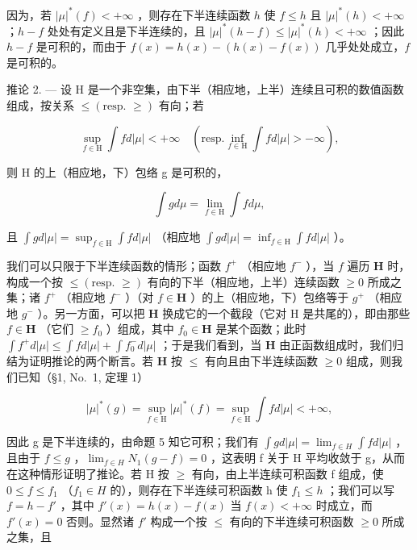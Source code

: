 因为，若 \(|\mu|^*(f) < +\infty\) ，则存在下半连续函数 \(h\) 使 \(f \leqslant h\) 且 \(|\mu|^*(h) < +\infty\) ；\(h - f\) 处处有定义且是下半连续的，且 \(|\mu|^*(h - f) \leqslant |\mu|^*(h) < +\infty\) ；因此 \(h - f\) 是可积的，而由于 \(f(x) = h(x) - (h(x) - f(x))\) 几乎处处成立，\(f\) 是可积的。

推论 2. --- 设 H 是一个非空集，由下半（相应地，上半）连续且可积的数值函数组成，按关系 \(\leqslant (\text{resp. } \geqslant)\) 有向；若

\[
\sup _ {f \in \mathrm{H}} \int f d | \mu | <   + \infty \quad (\mathrm{resp.} \inf _ {f \in \mathrm{H}} \int f d | \mu | > - \infty),
\]

则 H 的上（相应地，下）包络 g 是可积的，

\[
\int g d \mu = \lim _ {f \in \mathrm{H}} \int f d \mu ,
\]

且 \(\int g d|\mu| = \sup_{f\in \mathrm{H}}\int f d|\mu|\) （相应地 \(\int g d|\mu| = \inf_{f\in \mathrm{H}}\int f d|\mu|\) ）。

我们可以只限于下半连续函数的情形；函数 \(f^{+}\) （相应地 \(f^{-}\) ），当 \(f\) 遍历 \(\mathbf{H}\) 时，构成一个按 \(\leqslant (\text{resp. } \geqslant)\) 有向的下半（相应地，上半）连续函数 \(\geqslant 0\) 所成之集；诸 \(f^{+}\) （相应地 \(f^{-}\) ）（对 \(f \in \mathbf{H}\) ）的上（相应地，下）包络等于 \(g^{+}\) （相应地 \(g^{-}\) ）。另一方面，可以把 \(\mathbf{H}\) 换成它的一个截段（它对 H 是共尾的），即由那些 \(f \in \mathbf{H}\) （它们 \(\geqslant f_{0}\) ）组成，其中 \(f_{0} \in \mathbf{H}\) 是某个函数；此时 \(\int f^{+} d|\mu| \leqslant \int f d|\mu| + \int f_{0}^{-} d|\mu|\) ；于是我们看到，当 \(\mathbf{H}\) 由正函数组成时，我们归结为证明推论的两个断言。若 \(\mathbf{H}\) 按 \(\leqslant\) 有向且由下半连续函数 \(\geqslant 0\) 组成，则我们已知（§1, No.~1, 定理 1）

\[
| \mu | ^ {*} (g) = \sup _ {f \in \mathrm{H}} | \mu | ^ {*} (f) = \sup _ {f \in \mathrm{H}} \int f d | \mu | <   + \infty ,
\]

因此 g 是下半连续的，由命题 5 知它可积；我们有 \(\int g d|\mu| = \lim_{f \in H} \int f d|\mu|\) ，且由于 \(f \leqslant g\) ，\(\lim_{f \in H} N_1(g - f) = 0\) ，这表明 f 关于 H 平均收敛于 g，从而在这种情形证明了推论。若 H 按 \(\geqslant\) 有向，由上半连续可积函数 f 组成，使 \(0 \leqslant f \leqslant f_1\) （\(f_1 \in H\) 的），则存在下半连续可积函数 h 使 \(f_1 \leqslant h\) ；我们可以写 \(f = h - f'\) ，其中 \(f'(x) = h(x) - f(x)\) 当 \(f(x) < +\infty\) 时成立，而 \(f'(x) = 0\) 否则。显然诸 \(f'\) 构成一个按 \(\leqslant\) 有向的下半连续可积函数 \(\geqslant 0\) 所成之集，且

